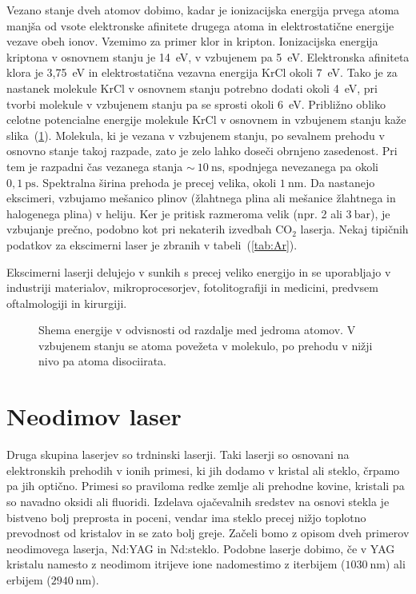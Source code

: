 Vezano stanje dveh atomov dobimo, kadar je ionizacijska energija prvega
atoma manjša od vsote elektronske afinitete drugega atoma in
elektrostatične energije vezave obeh ionov. Vzemimo za primer klor in
kripton. Ionizacijska energija kriptona v osnovnem stanju je 14~eV, v
vzbujenem pa 5~eV. Elektronska afiniteta klora je 3,75~eV in
elektrostatična vezavna energija KrCl okoli 7~eV. Tako je za nastanek
molekule KrCl v osnovnem stanju potrebno dodati okoli 4~eV, pri tvorbi
molekule v vzbujenem stanju pa se sprosti okoli 6~eV. Približno obliko
celotne potencialne energije molekule KrCl v osnovnem in vzbujenem stanju
kaže slika~(\ref{fig:exE}). Molekula, ki je vezana v vzbujenem stanju, po
sevalnem prehodu v osnovno stanje takoj razpade, zato je zelo lahko doseči
obrnjeno zasedenost. Pri tem je razpadni čas vezanega stanja $\sim~10~\si{\nano\second}$,
spodnjega nevezanega pa okoli $0,1~\si{\pico\second}$.
Spektralna širina prehoda je precej velika, okoli $1~\si{\nano\metre}$.
Da nastanejo ekscimeri, vzbujamo mešanico 
plinov (žlahtnega plina ali mešanice žlahtnega in halogenega plina) v heliju. Ker je pritisk
razmeroma velik (npr. 2 ali $3~\si{\bar}$), je vzbujanje prečno, podobno kot pri 
nekaterih izvedbah CO$_2$ laserja. Nekaj tipičnih podatkov 
za ekscimerni laser je zbranih v tabeli~(\ref{tab:Ar}).

Ekscimerni laserji delujejo v sunkih s precej veliko energijo in se uporabljajo 
v industriji materialov, mikroprocesorjev, fotolitografiji in medicini, predvsem 
oftalmologiji in kirurgiji.
\begin{figure}[h]
\centering
\def\svgwidth{50truemm} 

\caption{Shema energije v odvisnosti od razdalje med jedroma atomov. V vzbujenem stanju
se atoma povežeta v molekulo, po prehodu v nižji nivo pa atoma disociirata.}
\label{fig:exE}
\end{figure}


\section{Neodimov laser}
Druga skupina laserjev so trdninski laserji. Taki laserji
so osnovani na elektronskih prehodih v ionih primesi, ki jih dodamo v kristal ali steklo,
črpamo pa jih optično. Primesi so praviloma redke zemlje ali prehodne kovine, 
kristali pa so navadno oksidi ali fluoridi. Izdelava ojačevalnih sredstev na osnovi stekla
je bistveno bolj preprosta in poceni, vendar ima steklo precej nižjo toplotno prevodnost
od kristalov in se zato bolj greje. 
Začeli bomo z opisom dveh primerov neodimovega laserja, Nd:YAG in Nd:steklo. Podobne laserje dobimo, 
če v YAG kristalu namesto z neodimom itrijeve ione nadomestimo z iterbijem ($1030~\si{\nano\metre}$) ali erbijem ($2940~\si{\nano\metre}$).

